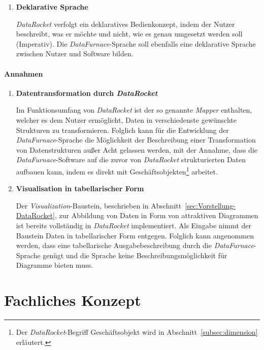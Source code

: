 \documentclass[
  language=german, %
  type=bachelor,%
  ngerman
]{isthesis}
\begin{document}
\begin{content}
\begin{enumerate}
			\item \textbf{Deklarative Sprache}
				
				\textit{DataRocket} verfolgt ein deklaratives Bedienkonzept, indem der
				Nutzer beschreibt, was er möchte und nicht, wie es genau umgesetzt werden
				soll (Imperativ). Die \textit{DataFurnace}-Sprache soll ebenfalls eine
				deklarative Sprache zwischen Nutzer und Software bilden.

    \end{enumerate}

	\paragraph{Annahmen} 

  \begin{enumerate}
    \item \textbf{Datentransformation durch \textit{DataRocket}}

      Im Funktionsumfang von \textit{DataRocket} ist der so genannte
      \textit{Mapper} enthalten, welcher es dem Nutzer ermöglicht, Daten in
      verschiedenste gewünschte Strukturen zu transformieren. Folglich kann für
      die Entwicklung der \textit{DataFurnace}-Sprache die Möglichkeit der
      Beschreibung einer Transformation von Datenstrukturen außer Acht gelassen
      werden, mit der Annahme, dass die \textit{DataFurnace}-Software auf die
      zuvor von \textit{DataRocket} strukturierten Daten aufbauen kann, indem
      es direkt mit Geschäftsobjekten\footnote{Der \textit{DataRocket}-Begriff
      Geschäftsobjekt wird in Abschnitt~\ref{subsec:dimension} erläutert.}
      arbeitet.

			\item \textbf{Visualisation in tabellarischer Form}

			Der \textit{Visualization}-Baustein, beschrieben in
			Abschnitt~\ref{sec:Vorstellung-DataRocket}, zur Abbildung von Daten in
			Form von attraktiven Diagrammen ist bereits vollständig in
			\textit{DataRocket} implementiert. Als Eingabe nimmt der Baustein Daten
			in tabellarischer Form entgegen. Folglich kann angenommen werden, dass
			eine tabellarische Ausgabebeschreibung durch die
			\textit{DataFurnace}-Sprache genügt und die Sprache keine
			Beschreibungsmöglichkeit für Diagramme bieten muss.



  \end{enumerate}


  \section{Fachliches Konzept}\label{sec:sprache/fachliches-konzept}


\end{content}
\end{document}
